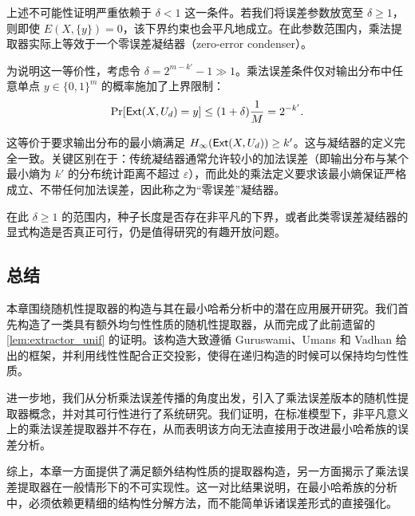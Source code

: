 \begin{remark}
    上述不可能性证明严重依赖于 $\delta < 1$ 这一条件。若我们将误差参数放宽至 $\delta \ge 1$，则即使 $E(X, \{y\}) = 0$，该下界约束也会平凡地成立。在此参数范围内，乘法提取器实际上等效于一个零误差凝结器（zero-error condenser）。
    
    为说明这一等价性，考虑令 $\delta = 2^{m-k'} - 1 \gg 1$。乘法误差条件仅对输出分布中任意单点 $y \in \{0,1\}^m$ 的概率施加了上界限制：
    $$
    \Pr[\mathsf{Ext}(X, U_d) = y] \le (1 + \delta) \frac{1}{M} = 2^{-k'}.
    $$
    
    这等价于要求输出分布的最小熵满足 $H_\infty(\mathsf{Ext}(X, U_d)) \ge k'$。这与凝结器的定义完全一致。关键区别在于：传统凝结器通常允许较小的加法误差（即输出分布与某个最小熵为 $k'$ 的分布统计距离不超过 $\varepsilon$），而此处的乘法定义要求该最小熵保证严格成立、不带任何加法误差，因此称之为“零误差”凝结器。
    
    在此 $\delta \ge 1$ 的范围内，种子长度是否存在非平凡的下界，或者此类零误差凝结器的显式构造是否真正可行，仍是值得研究的有趣开放问题。
\end{remark}

\subsection{总结}

本章围绕随机性提取器的构造与其在最小哈希分析中的潜在应用展开研究。我们首先构造了一类具有额外均匀性性质的随机性提取器，从而完成了此前遗留的 \cref{lem:extractor_unif} 的证明。该构造大致遵循 Guruswami、Umans 和 Vadhan \cite{GUV_extractor} 给出的框架，并利用线性性配合正交投影，使得在递归构造的时候可以保持均匀性性质。

进一步地，我们从分析乘法误差传播的角度出发，引入了乘法误差版本的随机性提取器概念，并对其可行性进行了系统研究。我们证明，在标准模型下，非平凡意义上的乘法误差提取器并不存在，从而表明该方向无法直接用于改进最小哈希族的误差分析。

综上，本章一方面提供了满足额外结构性质的提取器构造，另一方面揭示了乘法误差提取器在一般情形下的不可实现性。这一对比结果说明，在最小哈希族的分析中，必须依赖更精细的结构性分解方法，而不能简单诉诸误差形式的直接强化。